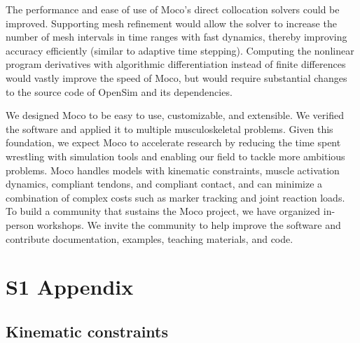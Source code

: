 \documentclass[10pt,letterpaper]{article}
\begin{document}
The performance and ease of use of Moco’s direct collocation solvers could be improved. Supporting mesh refinement would allow the solver to increase the number of mesh intervals in time ranges with fast dynamics, thereby improving accuracy efficiently (similar to adaptive time stepping). Computing the nonlinear program derivatives with algorithmic differentiation instead of finite differences would vastly improve the speed of Moco, but would require substantial changes to the source code of OpenSim and its dependencies.

We designed Moco to be easy to use, customizable, and extensible. We verified the software and applied it to multiple musculoskeletal problems. Given this foundation, we expect Moco to accelerate research by reducing the time spent wrestling with simulation tools and enabling our field to tackle more ambitious problems. Moco handles models with kinematic constraints, muscle activation dynamics, compliant tendons, and compliant contact, and can minimize a combination of complex costs such as marker tracking and joint reaction loads. To build a community that sustains the Moco project, we have organized in-person workshops. We invite the community to help improve the software and contribute documentation, examples, teaching materials, and code.

\section*{S1 Appendix}

\subsection*{Kinematic constraints}
\end{document}
